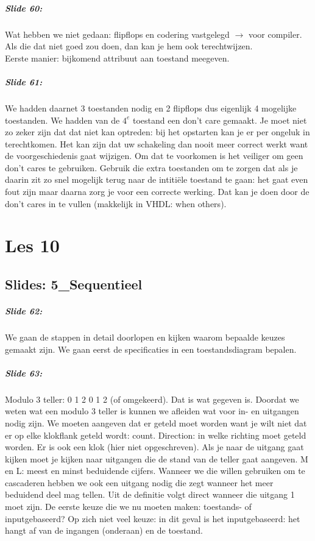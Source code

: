 \documentclass[10pt,a4paper]{book}
\begin{document}
\paragraph{Slide 60:} Wat hebben we niet gedaan: flipflops en codering vastgelegd $\rightarrow$ voor compiler. Als die dat niet goed zou doen, dan kan je hem ook terechtwijzen.\\
Eerste manier: bijkomend attribuut aan toestand meegeven. 

\paragraph{Slide 61:} We hadden daarnet 3 toestanden nodig en 2 flipflops dus eigenlijk 4 mogelijke toestanden. We hadden van de $4^e$ toestand een don't care gemaakt. Je moet niet zo zeker zijn dat dat niet kan optreden: bij het opstarten kan je er per ongeluk in terechtkomen. Het kan zijn dat uw schakeling dan nooit meer correct werkt want de voorgeschiedenis gaat wijzigen. Om dat te voorkomen is het veiliger om geen don't cares te gebruiken. Gebruik die extra toestanden om te zorgen dat als je daarin zit zo snel mogelijk terug naar de intiti\"ele toestand te gaan: het gaat even fout zijn maar daarna zorg je voor een correcte werking.
Dat kan je doen door de don't cares in te vullen (makkelijk in VHDL: when others).

\chapter{Les 10}

\section{Slides: 5\_Sequentieel}

\paragraph{Slide 62:} We gaan de stappen in detail doorlopen en kijken waarom bepaalde keuzes gemaakt zijn. We gaan eerst de specificaties in een toestandsdiagram bepalen.

\paragraph{Slide 63:} Modulo 3 teller: 0 1 2 0 1 2 (of omgekeerd). Dat is wat gegeven is. Doordat we weten wat een modulo 3 teller is kunnen we afleiden wat voor in- en uitgangen nodig zijn. We moeten aangeven dat er geteld moet worden want je wilt niet dat er op elke klokflank geteld wordt: count. Direction: in welke richting moet geteld worden. Er is ook een klok (hier niet opgeschreven). Als je naar de uitgang gaat kijken moet je kijken naar uitgangen die de stand van de teller gaat aangeven. M en L: meest en minst beduidende cijfers. Wanneer we die willen gebruiken om te cascaderen hebben we ook een uitgang nodig die zegt wanneer het meer beduidend deel mag tellen. Uit de definitie volgt direct wanneer die uitgang 1 moet zijn. De eerste keuze die we nu moeten maken: toestands- of inputgebaseerd? Op zich niet veel keuze: in dit geval is het inputgebaseerd: het hangt af van de ingangen (onderaan) en de toestand.
\end{document}
